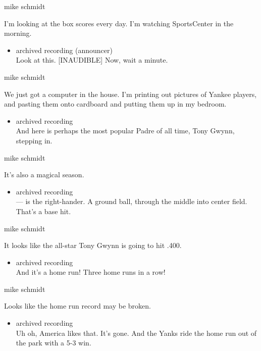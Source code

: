 mike schmidt

I'm looking at the box scores every day. I'm watching SportsCenter in
the morning.

\begin{itemize}
\tightlist
\item
  archived recording (announcer)\\
  Look at this. {[}INAUDIBLE{]} Now, wait a minute.
\end{itemize}

mike schmidt

We just got a computer in the house. I'm printing out pictures of Yankee
players, and pasting them onto cardboard and putting them up in my
bedroom.

\begin{itemize}
\tightlist
\item
  archived recording\\
  And here is perhaps the most popular Padre of all time, Tony Gwynn,
  stepping in.
\end{itemize}

mike schmidt

It's also a magical season.

\begin{itemize}
\tightlist
\item
  archived recording\\
  --- is the right-hander. A ground ball, through the middle into center
  field. That's a base hit.
\end{itemize}

mike schmidt

It looks like the all-star Tony Gwynn is going to hit .400.

\begin{itemize}
\tightlist
\item
  archived recording\\
  And it's a home run! Three home runs in a row!
\end{itemize}

mike schmidt

Looks like the home run record may be broken.

\begin{itemize}
\tightlist
\item
  archived recording\\
  Uh oh, America likes that. It's gone. And the Yanks ride the home run
  out of the park with a 5-3 win.
\end{itemize}

